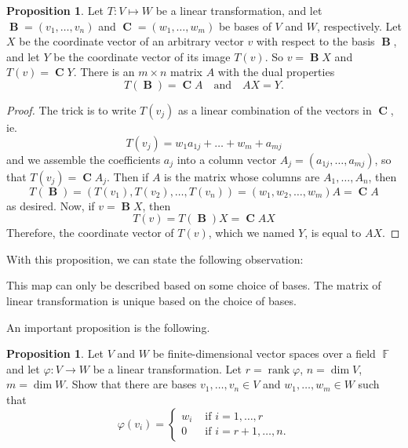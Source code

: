 \documentclass[11pt]{amsart} %
\theoremstyle{definition}
\newtheorem{proposition}[definition]{Proposition}
\theoremstyle{definition}
\DeclareMathOperator{\F}{\mathbb{F}}
\DeclareMathOperator{\FF}{\mathcal{F}}
\DeclareMathOperator{\rank}{rank}
\DeclareMathOperator{\hv}{\mathbf{B}}
\DeclareMathOperator{\hvc}{\mathbf{C}}
\numberwithin{equation}{section}
\begin{document}
\begin{proposition}
	Let $T: V \mapsto  W$ be a linear transformation, and let $\hv = (v_1, \dots, v_n)$ and $\hvc = (w_1 , \dots, w_m)$ be bases of $V$ and $W$, respectively. Let $X$ be the coordinate vector of an arbitrary vector $v$ with respect to the basis $\hv$, and let $Y$ be the coordinate vector of its image $T(v)$. So $v = \hv X$ and $T(v) = \hvc Y$. There is an $m \times n$ matrix $A$ with the dual properties
	$$ T(\hv) = \hvc A \quad \text{and} \quad  AX = Y. $$
\end{proposition}

\begin{proof}
	The trick is to write $T(v_j)$ as a linear combination of the vectors in $\hvc$, ie.
	$$ T(v_j ) = w_1 a_{1j} + \dots + w_m + a_{mj} $$
	and we assemble the coefficients $a_j$ into a column vector $A_j = ( a_{1j} , \dots, a_{mj})$, so that $T(v_j) = \hvc A_j$. Then if $A$ is the matrix whose columns are $A_1 , \dots, A_n$, then
	$$ T(\hv) = ( T(v_1), T(v_2) , \dots, T(v_n) ) = (w_1, w_2, \dots, w_m) A = \hvc A $$
	as desired. Now, if $v = \hv X$, then
	$$ T(v) = T(\hv ) X = \hvc A X$$
	Therefore, the coordinate vector of $T(v)$, which we named $Y$, is equal to $AX$.
\end{proof}

With this proposition, we can state the following observation:

\begin{figure}[H]
	\centering
\end{figure}
This map can only be described based on some choice of bases. The matrix of linear transformation is unique based on the choice of bases.

An important proposition is the following.

\begin{proposition}
	Let \(V\) and \(W\) be finite-dimensional vector spaces over a field \( \F \) and let \(\varphi : V\to W\) be a linear transformation. Let \(r=\rank \varphi\), \(n=\dim V\), \(m=\dim W\). Show that there are bases \(v_1,\dots, v_n\in V\) and \(w_1,\dots, w_m\in W\) such that
	$$\varphi(v_i)=\begin{cases} w_i & \text{ if $i=1,\dots,r$ } \\ 0 & \text{ if $i=r+1,\dots,n$.}\end{cases}$$
\end{proposition}
\end{document}
